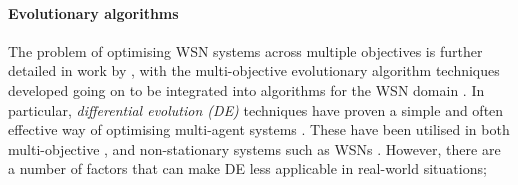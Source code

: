 \paragraph{Evolutionary algorithms}

The problem of optimising WSN systems across multiple objectives is further detailed in work by \citep{ s150717572}, with the multi-objective evolutionary algorithm techniques developed going on to be integrated into algorithms for the WSN domain \citep{4633340,SENGUPTA2013405}. In particular, \textit{differential evolution (DE)} techniques have proven a simple and often effective way of optimising multi-agent systems \citep{Suganthan2012,Godzik2019, Opara2019}. These have been utilised in both multi-objective \citep{Mohd2020}, and non-stationary systems \citep{Cep2017,Zhang2020a} such as WSNs \citep{Xu2013}. However, there are a number of factors that can make DE less applicable in real-world situations;
